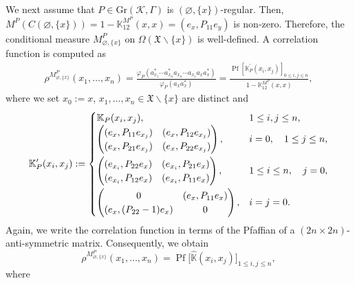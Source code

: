 \documentclass[11pt]{article}
\numberwithin{equation}{section}
\numberwithin{equation}{section}
\newcommand{\pr}[1]{#1^{\prime}}
\newcommand{\pf}{\operatorname{Pf}}
\newcommand{\mfrak}[1]{\mathfrak{#1}}
\newcommand{\mcal}[1]{\mathcal{#1}}
\newcommand{\mbb}[1]{\mathbb{#1}}
\newcommand{\mrm}[1]{\mathrm{#1}}
\newcommand{\what}[1]{\widehat{#1}}
\begin{document}
We next assume that $P\in \mrm{Gr}(\mcal{K},\Gamma)$ is $(\varnothing,\{x\})$-regular. Then, $M^{P}(C(\varnothing,\{x\}))=1-\mbb{K}^{M^{P}}_{12}(x,x)=(e_{x},P_{11}e_{y})$ is non-zero. Therefore, the conditional measure $M^{P}_{\varnothing,\{x\}}$ on $\Omega (\mfrak{X}\backslash\{x\})$ is well-defined. A correlation function is computed as
\begin{gather*}
	\rho^{M^{P}_{\varnothing,\{x\}}}(x_{1},\dots, x_{n}) =\frac{\varphi_{P}(a_{x_{1}}^{\ast}\cdots a_{x_{n}}^{\ast}a_{x_{n}}\cdots a_{x_{1}}a_{x}a^{\ast}_{x})}{\varphi_{P}(a_{x}a^{\ast}_{x})}
	 =\frac{\pf [\pr{\mbb{K}}_{P}(x_{i},x_{j}) ]_{0\le i,j\le n}}{1-\mbb{K}^{M^{P}}_{12}(x,x)},
\end{gather*}
where we set $x_{0}:=x$, $x_{1},\dots, x_{n}\in \mfrak{X}\backslash\{x\}$ are distinct and
\begin{gather*}
	\pr{\mbb{K}}_{P}(x_{i},x_{j}):=
	\begin{cases}
		\mbb{K}_{P}(x_{i},x_{j}), & 1\le i,j\le n, \\
		\left(
		\begin{matrix}
			(e_{x},P_{11}e_{x_{j}}) & (e_{x},P_{12}e_{x_{j}}) \\
			(e_{x}, P_{21}e_{x_{j}}) & (e_{x},P_{22}e_{x_{j}})
		\end{matrix}
		\right), & i=0,\quad 1\le j\le n, \vspace{1mm}\\
		\left(
		\begin{matrix}
			(e_{x_{i}},P_{22}e_{x}) & (e_{x_{i}},P_{21}e_{x}) \\
			(e_{x_{i}}, P_{12}e_{x}) & (e_{x_{i}},P_{11}e_{x})
		\end{matrix}
		\right), & 1\le i \le n,\quad j=0, \vspace{1mm}\\
		\left(
		\begin{matrix}
			0 & (e_{x},P_{11}e_{x}) \\
			(e_{x}, (P_{22}-1)e_{x}) & 0
		\end{matrix}
		\right), & i=j=0.
	\end{cases}
\end{gather*}
Again, we write the correlation function in terms of the Pfaffian of a $(2n\times 2n)$-anti-symmetric matrix. Consequently, we obtain
\begin{equation*}
	\rho^{M^{P}_{\varnothing,\{x\}}}(x_{1},\dots, x_{n})=\pf\big[\what{\mbb{K}}(x_{i},x_{j})\big]_{1\le i,j\le n},
\end{equation*}
where
\end{document}
